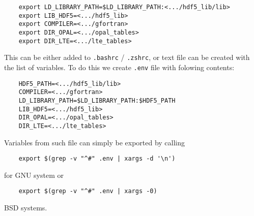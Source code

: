 \documentclass[10pt,a4paper]{article}
\begin{document}
\begin{enumerate}
  \begin{verbatim}
    export LD_LIBRARY_PATH=$LD_LIBRARY_PATH:<.../hdf5_lib/lib>
    export LIB_HDF5=<.../hdf5_lib>
    export COMPILER=<.../gfortran>
    export DIR_OPAL=<.../opal_tables>
    export DIR_LTE=<.../lte_tables>
  \end{verbatim}
  This can be either added to \texttt{.bashrc} / \texttt{.zshrc}, or text file can be created with the list of variables. 
  To do this we create \texttt{.env} file with folowing contents: 
  \begin{verbatim}
    HDF5_PATH=<.../hdf5_lib/lib>
    COMPILER=<.../gfortran>
    LD_LIBRARY_PATH=$LD_LIBRARY_PATH:$HDF5_PATH
    LIB_HDF5=<.../hdf5_lib>
    DIR_OPAL=<.../opal_tables>
    DIR_LTE=<.../lte_tables>
  \end{verbatim}
  Variables from such file can simply be exported by calling
  \begin{verbatim}
    export $(grep -v "^#" .env | xargs -d '\n')
  \end{verbatim}
  for GNU system or 
  \begin{verbatim}
    export $(grep -v "^#" .env | xargs -0)
  \end{verbatim}
  BSD systems.
\end{enumerate}
\end{document}
